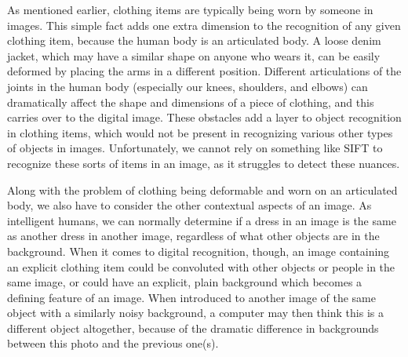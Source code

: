 \documentclass[12pt]{report} %
\begin{document}
	As mentioned earlier, clothing items are typically being worn by someone in images. This simple fact adds one extra dimension to the recognition of any given clothing item, because the human body is an articulated body. A loose denim jacket, which may have a similar shape on anyone who wears it, can be easily deformed by placing the arms in a different position. Different articulations of the joints in the human body (especially our knees, shoulders, and elbows) can dramatically affect the shape and dimensions of a piece of clothing, and this carries over to the digital image. These obstacles add a layer to object recognition in clothing items, which would not be present in recognizing various other types of objects in images. Unfortunately, we cannot rely on something like SIFT\cite{lowe1999object} to recognize these sorts of items in an image, as it struggles to detect these nuances. 


	Along with the problem of clothing being deformable and worn on an articulated body, we also have to consider the other contextual aspects of an image. As intelligent humans, we can normally determine if a dress in an image is the same as another dress in another image, regardless of what other objects are in the background. When it comes to digital recognition, though, an image containing an explicit clothing item could be convoluted with other objects or people in the same image, or could have an explicit, plain background which becomes a defining feature of an image. When introduced to another image of the same object with a similarly noisy background, a computer may then think this is a different object altogether, because of the dramatic difference in backgrounds between this photo and the previous one(s). 
	
\end{document}
